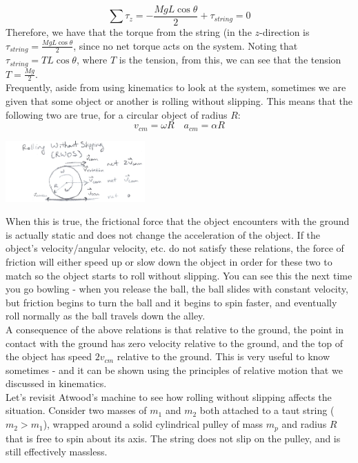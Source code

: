 \[
	\sum \tau_z = -\frac{MgL\cos \theta}{2} + \tau_{string} = 0
\]
Therefore, we have that the torque from the string (in the $z$-direction is $\tau_{string} = \frac{MgL\cos \theta}{2}$, since no net torque acts on the system. Noting that $\tau_{string} = TL\cos \theta$, where $T$ is the tension, from this, we can see that the tension $T = \frac{Mg}{2}$. \\
Frequently, aside from using kinematics to look at the system, sometimes we are given that some object or another is rolling without slipping. This means that the following two are true, for a circular object of radius $R$: 
\[
	v_{cm} = \omega R \quad a_{cm} = \alpha R
\]
\begin{center}
	\includegraphics[width=0.4\textwidth]{images/mechintro/rwos.png}\\
\end{center}
When this is true, the frictional force that the object encounters with the ground is actually static and does not change the acceleration of the object. If the object's velocity/angular velocity, etc. do not satisfy these relations, the force of friction will either speed up or slow down the object in order for these two to match so the object starts to roll without slipping. You can see this the next time you go bowling - when you release the ball, the ball slides with constant velocity, but friction begins to turn the ball and it begins to spin faster, and eventually roll normally as the ball travels down the alley. \\
A consequence of the above relations is that relative to the ground, the point in contact with the ground has zero velocity relative to the ground, and the top of the object has speed $2v_{cm}$ relative to the ground. This is very useful to know sometimes - and it can be shown using the principles of relative motion that we discussed in kinematics. \\
Let's revisit Atwood's machine to see how rolling without slipping affects the situation. Consider two masses of $m_1$ and $m_2$ both attached to a taut string ($m_2 > m_1$), wrapped around a solid cylindrical pulley of mass $m_p$ and radius $R$ that is free to spin about its axis. The string does not slip on the pulley, and is still effectively massless. \\
